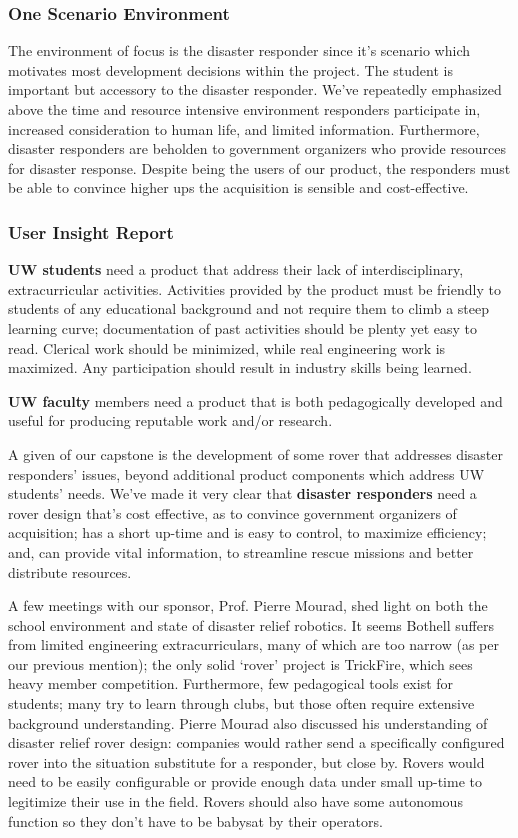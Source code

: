 \documentclass[a4paper, 10pt]{article}
\begin{document}
		\subsubsection*{One Scenario Environment}
		The environment of focus is the disaster responder since it's scenario which motivates most development decisions within the project. The student is important but accessory to the disaster responder. We've repeatedly emphasized above the time and resource intensive environment responders participate in, increased consideration to human life, and limited information. Furthermore, disaster responders are beholden to government organizers who provide resources for disaster response. Despite being the users of our product, the responders must be able to convince higher ups the acquisition is sensible and cost-effective.

		\subsubsection{User Insight Report}
		\textbf{UW students} need a product that address their lack of interdisciplinary, extracurricular activities. Activities provided by the product must be friendly to students of any educational background and not require them to climb a steep learning curve; documentation of past activities should be plenty yet easy to read. Clerical work should be minimized, while real engineering work is maximized. Any participation should result in industry skills being learned.
		
		\textbf{UW faculty} members need a product that is both pedagogically developed and useful for producing reputable work and/or research. 		
		
		A given of our capstone is the development of some rover that addresses disaster responders' issues, beyond additional product components which address UW students' needs. We've made it very clear that \textbf{disaster responders} need a rover design that's cost effective, as to convince government organizers of acquisition; has a short up-time and is easy to control, to maximize efficiency; and, can provide vital information, to streamline rescue missions and better distribute resources.
		
		A few meetings with our sponsor, Prof. Pierre Mourad, shed light on both the school environment and state of disaster relief robotics. It seems Bothell suffers from limited engineering extracurriculars, many of which are too narrow (as per our previous mention); the only solid `rover' project is TrickFire, which sees heavy member competition. Furthermore, few pedagogical tools exist for students; many try to learn through clubs, but those often require extensive background understanding. Pierre Mourad  also discussed his understanding of disaster relief rover design: companies would rather send a specifically configured rover into the situation substitute for a responder, but close by. Rovers would need to be easily configurable or provide enough data under small up-time to legitimize their use in the field. Rovers should also have some autonomous  function so they don't have to be babysat by their operators.
\end{document}
